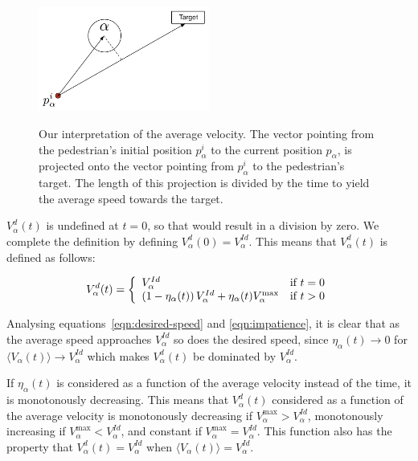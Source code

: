 \begin{figure}[ht]
    \centering
    {\includegraphics[width=0.5\textwidth]{Figures/impatience.pdf}}
    \caption[Our interpretation of the average velocity]{Our interpretation of
    the average velocity. The vector pointing from the pedestrian's initial
    position $p^i_\alpha$ to the current position $p_\alpha$, is projected 
    onto the vector pointing from $p^i_\alpha$ to the pedestrian's target. The 
    length of this projection is divided by the time to yield the average 
    speed towards the target.}
    \label{impatience}
\end{figure}

$V^d_\alpha(t)$ is undefined at $t=0$, so that would result in a
division by zero. We complete the definition by defining 
$V^d_\alpha(0)=V^{Id}_\alpha$. This means that $V^d_\alpha(t)$
is defined as follows:

\begin{equation}\label{eqn:cond-define}
    V_{\alpha}^{d} (t) = \left\{
    \begin{array}{l l}
        V_\alpha^{Id} & \text{if $t=0$}\\
        \left( 1 - \eta_{\alpha}(t) \right)
        V^{Id}_{\alpha} +
        \eta_{\alpha}(t) V_{\alpha}^{\text{max}}
        & \text{if $t > 0$}\\
    \end{array} \right.
\end{equation}

Analysing equations~\eqref{eqn:desired-speed} and \eqref{eqn:impatience}, it
is clear that as the average speed approaches $V^{Id}_\alpha$ so does the
desired speed, since $\eta_\alpha(t)\rightarrow0$ for $\langle V_\alpha(t)
\rangle \rightarrow V^{Id}_\alpha$ which makes $V^d_\alpha(t)$ be dominated by
$V^{Id}_\alpha$.

If $\eta_\alpha(t)$ is considered as a function of the average velocity
instead of the time, it is monotonously decreasing. This means that
$V^d_\alpha(t)$ considered as a function of the average velocity is
monotonously decreasing if $V^{\text{max}}_\alpha > V^{Id}_\alpha$,
monotonously increasing if $V^{\text{max}}_\alpha < V^{Id}_\alpha$, and
constant if $V^{\text{max}}_\alpha = V^{Id}_\alpha$. This function also has
the property that $V^d_\alpha(t)=V^{Id}_\alpha$ when $\langle V_\alpha(t)
\rangle = V^{Id}_\alpha$.

